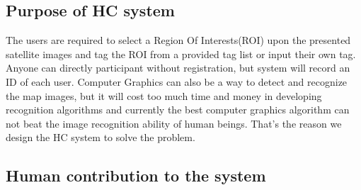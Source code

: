 \subsection{Purpose of HC system}
		The users are required to select a Region Of Interests(ROI) upon the presented satellite images and tag the ROI from a provided tag list or input their own tag. Anyone can directly participant without registration, but system will record an ID of each user.
		Computer Graphics can also be a way to detect and recognize the map images, but it will cost too much time and money in developing recognition algorithms and currently the best computer graphics algorithm can not beat the image recognition ability of human beings. That's the reason we design the HC system to solve the problem.
\subsection{Human contribution to the system}
